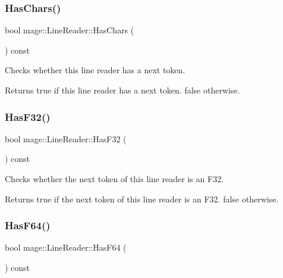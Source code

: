 \subsubsection{\texorpdfstring{Has\+Chars()}{HasChars()}}
{\footnotesize\ttfamily bool mage\+::\+Line\+Reader\+::\+Has\+Chars (\begin{DoxyParamCaption}{ }\end{DoxyParamCaption}) const\hspace{0.3cm}{\ttfamily [protected]}}

Checks whether this line reader has a next token.

\begin{DoxyReturn}{Returns}
{\ttfamily true} if this line reader has a next token. {\ttfamily false} otherwise. 
\end{DoxyReturn}
\hypertarget{classmage_1_1_line_reader_a2b2b2719576045b6531a2b8b31c61cee}{}\label{classmage_1_1_line_reader_a2b2b2719576045b6531a2b8b31c61cee} 
\subsubsection{\texorpdfstring{Has\+F32()}{HasF32()}}
{\footnotesize\ttfamily bool mage\+::\+Line\+Reader\+::\+Has\+F32 (\begin{DoxyParamCaption}{ }\end{DoxyParamCaption}) const\hspace{0.3cm}{\ttfamily [protected]}}

Checks whether the next token of this line reader is an {\ttfamily F32}.

\begin{DoxyReturn}{Returns}
{\ttfamily true} if the next token of this line reader is an {\ttfamily F32}. {\ttfamily false} otherwise. 
\end{DoxyReturn}
\hypertarget{classmage_1_1_line_reader_a65f4edadd232fdd19c7ba9d044c7d2aa}{}\label{classmage_1_1_line_reader_a65f4edadd232fdd19c7ba9d044c7d2aa} 
\subsubsection{\texorpdfstring{Has\+F64()}{HasF64()}}
{\footnotesize\ttfamily bool mage\+::\+Line\+Reader\+::\+Has\+F64 (\begin{DoxyParamCaption}{ }\end{DoxyParamCaption}) const\hspace{0.3cm}{\ttfamily [protected]}}

